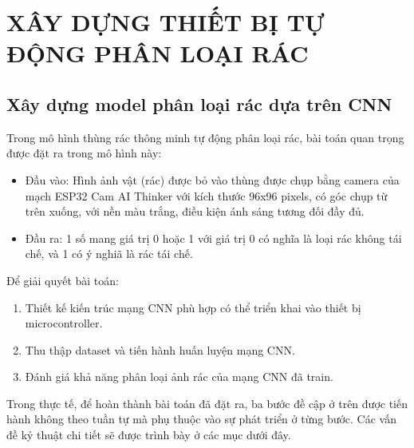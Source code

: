 

\chapter{XÂY DỰNG THIẾT BỊ TỰ ĐỘNG PHÂN LOẠI RÁC}



\section{Xây dựng model phân loại rác dựa trên CNN}
Trong mô hình thùng rác thông minh tự động phân loại rác, bài toán quan trọng được đặt ra trong mô hình này:
\begin{itemize}
    \item Đầu vào: Hình ảnh vật (rác) được bỏ vào thùng được chụp bằng camera của mạch ESP32 Cam AI Thinker với kích thước 96x96 pixels, có góc chụp từ trên xuống, với nền màu trắng, điều kiện ánh sáng tương đối đầy đủ. 
    \item Đầu ra: 1 số mang giá trị 0 hoặc 1 với giá trị 0 có nghĩa là loại rác không tái chế, và 1 có ý nghiã là rác tái chế. 
\end{itemize}

Để giải quyết bài toán: 
\begin{enumerate}
    \item Thiết kế kiến trúc mạng CNN phù hợp có thể triển khai vào thiết bị microcontroller.
    \item Thu thập dataset và tiến hành huấn luyện mạng CNN.
    \item Đánh giá khả năng phân loại ảnh rác của mạng CNN đã train.
\end{enumerate}

Trong thực tế, để hoàn thành bài toán đã đặt ra, ba bước đề cập ở trên được tiến hành không theo tuần tự mà phụ thuộc vào sự phát triển ở từng bước. Các vấn đề kỷ thuật chi tiết sẽ được trình bày ở các mục dưới đây.

